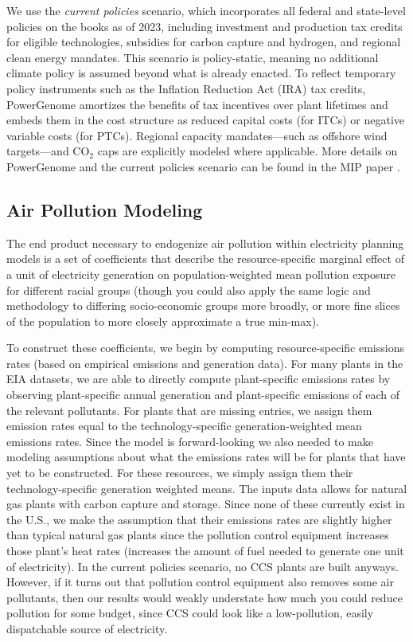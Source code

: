 \documentclass[a4paper]{article}
\theoremstyle{definition}
\theoremstyle{plain}
\begin{document}
We use the \textit{current policies} scenario, which incorporates all federal and state-level policies on the books as of 2023, including investment and production tax credits for eligible technologies, subsidies for carbon capture and hydrogen, and regional clean energy mandates. This scenario is policy-static, meaning no additional climate policy is assumed beyond what is already enacted. To reflect temporary policy instruments such as the Inflation Reduction Act (IRA) tax credits, PowerGenome amortizes the benefits of tax incentives over plant lifetimes and embeds them in the cost structure as reduced capital costs (for ITCs) or negative variable costs (for PTCs). Regional capacity mandates—such as offshore wind targets—and CO$_2$ caps are explicitly modeled where applicable. More details on PowerGenome and the current policies scenario can be found in the MIP paper \citep{Schivley2024ProcessModels}.
 

\subsection{Air Pollution Modeling}
The end product necessary to endogenize air pollution within electricity planning models is a set of coefficients that describe the resource-specific marginal effect of a unit of electricity generation on population-weighted mean pollution exposure for different racial groups (though you could also apply the same logic and methodology to differing socio-economic groups more broadly, or more fine slices of the population to more closely approximate a true min-max). 

To construct these coefficients, we begin by computing resource-specific emissions rates (based on empirical emissions and generation data). For many plants in the EIA datasets, we are able to directly compute plant-specific emissions rates by observing plant-specific annual generation and plant-specific emissions of each of the relevant pollutants. For plants that are missing entries, we assign them emission rates equal to the technology-specific generation-weighted mean emissions rates. Since the model is forward-looking we also needed to make modeling assumptions about what the emissions rates will be for plants that have yet to be constructed. For these resources, we simply assign them their technology-specific generation weighted means. The inputs data allows for natural gas plants with carbon capture and storage. Since none of these currently exist in the U.S., we make the assumption that their emissions rates are slightly higher than typical natural gas plants since the pollution control equipment increases those plant's heat rates (increases the amount of fuel needed to generate one unit of electricity). In the current policies scenario, no CCS plants are built anyways. However, if it turns out that pollution control equipment also removes some air pollutants, then our results would weakly understate how much you could reduce pollution for some budget, since CCS could look like a low-pollution, easily dispatchable source of electricity.
\end{document}
